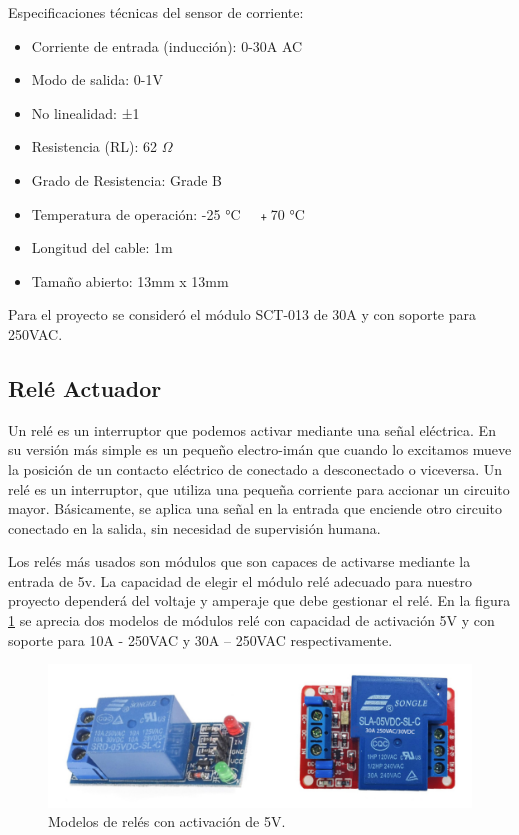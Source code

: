 Especificaciones técnicas del sensor de corriente:

\begin{itemize}
\item Corriente de entrada (inducción): 0-30A AC
\item Modo de salida: 0-1V
\item No linealidad: ±1%
\item Resistencia (RL): 62 $\Omega $
\item Grado de Resistencia: Grade B
\item Temperatura de operación: -25 °C ~ ﹢70 °C
\item Longitud del cable: 1m
\item Tamaño abierto: 13mm x 13mm
\end{itemize}

Para el proyecto se consideró el módulo SCT-013 de 30A y con soporte para 250VAC.

\subsection{Relé Actuador}

Un relé es un interruptor que podemos activar mediante una señal eléctrica. En su versión más simple es un pequeño electro-imán que cuando lo excitamos mueve la posición de un contacto eléctrico de conectado a desconectado o viceversa. Un relé es un interruptor, que utiliza una pequeña corriente para accionar un circuito mayor. Básicamente, se aplica una señal en la entrada que enciende otro circuito conectado en la salida, sin necesidad de supervisión humana.

Los relés más usados son módulos que son capaces de activarse mediante la entrada de 5v. La capacidad de elegir el módulo relé adecuado para nuestro proyecto dependerá del voltaje y amperaje que debe gestionar el relé. En la figura \ref{fig:rele} se aprecia dos modelos de módulos relé con capacidad de activación 5V y con soporte para 10A - 250VAC y 30A – 250VAC respectivamente.


\begin{figure}[htbp]
	\centering
	\includegraphics[width=1.0\textwidth]{./Figures/rele.jpg}
	\caption{Modelos de relés con activación de 5V.}

	\label{fig:rele}
\end{figure}

